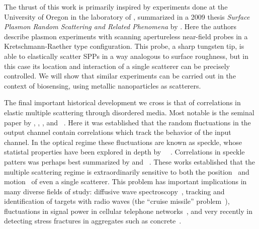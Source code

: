 The thrust of this work is primarily inspired by experiments done at the
University of Oregon in the laboratory of , summarized
in a 2009 thesis \textit{Surface Plasmon Random Scattering and Related
Phenomena} \cite{schumann2009surface} by .  Here
the authors describe plasmon experiments with scanning apertureless
near-field probes in a Kretschmann-Raether type configuration.  This probe,
a sharp tungsten tip, is able to elastically scatter SPPs in a way
analogous to surface roughness, but in this case its location and
interaction of a single scatterer can be precisely controlled.  We will
show that similar experiments can be carried out in the context of
biosensing, using metallic nanoparticles as scatterers.

The final important historical development we cross is that of correlations
in elastic multiple scattering through disordered media.  Most notable is
the seminal paper by , , , and
~\cite{feng1988correlations}.  Here it was established that
the random fluctuations in the output channel contain correlations which
track the behavior of the input channel.  In the optical regime these
fluctuations are known as speckle, whose statistal properties have been
explored in depth by
~\cite{goodman2007speckle}~\cite{goodman1975statistical}.
Correlations in speckle patters was perhaps best summarized by
 and ~\cite{berkovits1994correlations}.  These
works established that the multiple scattering regime is extraordinarily
sensitive to both the position~\cite{berkovits1990theory} and
motion~\cite{berkovits1991sensitivity} of even a single scatterer.  This
problem has important implications in many diverse fields of study:
diffusive wave spectroscopy~\cite{pine1988diffusing}, tracking and
identification of targets with radio waves (the ``cruise missile''
problem~\cite{atkins1991neural}), fluctuations in signal power in cellular
telephone networks~\cite{abdi2001estimation}, and very recently in
detecting stress fractures in aggregates such as
concrete~\cite{larose2010locating}.  
